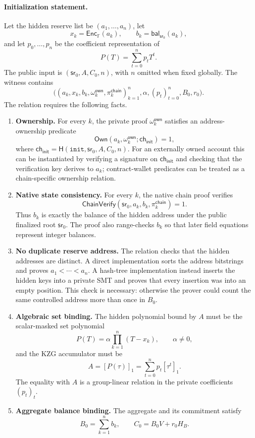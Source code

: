 \documentclass[runningheads]{llncs}
\newcommand{\F}{\mathbb{F}}
\newcommand{\Enc}{\mathsf{Enc}}
\newcommand{\bal}{\mathsf{bal}}
\newcommand{\sr}{\mathsf{sr}}
\newcommand{\Hash}{\mathsf{H}}
\begin{document}
\paragraph{Initialization statement.}
Let the hidden reserve list be \((a_1,\ldots,a_n)\), let
\[
        x_k=\Enc_{\F}(a_k),\qquad b_k=\bal_{\sr_0}(a_k),
\]
and let \(p_0,\ldots,p_n\) be the coefficient representation of
\[
        P(T)=\sum_{t=0}^n p_tT^t .
\]
The public input is \((\sr_0,A,C_0,n)\), with \(n\) omitted when fixed globally.  The witness contains
\[
 \bigl((a_k,x_k,b_k,\omega_k^{\mathsf{own}},\pi_k^{\mathsf{chain}})_{k=1}^n,
        \alpha,(p_t)_{t=0}^n,B_0,r_0\bigr).
\]
The relation requires the following facts.
\begin{enumerate}[leftmargin=1.5em]
    \item \textbf{Ownership.}  For every \(k\), the private proof \(\omega_k^{\mathsf{own}}\) satisfies an address-ownership predicate
    \[
        \mathsf{Own}(a_k,\omega_k^{\mathsf{own}};\mathsf{ch}_{\mathsf{init}})=1,
    \]
    where \(\mathsf{ch}_{\mathsf{init}}=\Hash(\mathtt{init},\sr_0,A,C_0,n)\).  For an externally owned account this can be instantiated by verifying a signature on \(\mathsf{ch}_{\mathsf{init}}\) and checking that the verification key derives to \(a_k\); contract-wallet predicates can be treated as a chain-specific ownership relation.
    \item \textbf{Native state consistency.}  For every \(k\), the native chain proof verifies
    \[
        \mathsf{ChainVerify}(\sr_0,a_k,b_k,\pi_k^{\mathsf{chain}})=1 .
    \]
    Thus \(b_k\) is exactly the balance of the hidden address under the public finalized root \(\sr_0\).  The proof also range-checks \(b_k\) so that later field equations represent integer balances.
    \item \textbf{No duplicate reserve address.}  The relation checks that the hidden addresses are distinct.  A direct implementation sorts the address bitstrings and proves \(a_1<\cdots<a_n\).  A hash-tree implementation instead inserts the hidden keys into a private SMT and proves that every insertion was into an empty position.  This check is necessary: otherwise the prover could count the same controlled address more than once in \(B_0\).
    \item \textbf{Algebraic set binding.}  The hidden polynomial bound by \(A\) must be the scalar-masked set polynomial
    \[
        P(T)=\alpha\prod_{k=1}^n(T-x_k),\qquad \alpha\ne0,
    \]
    and the KZG accumulator must be
    \[
        A=[P(\tau)]_1=\sum_{t=0}^n p_t[\tau^t]_1 .
    \]
    The equality with \(A\) is a group-linear relation in the private coefficients \((p_t)_t\).
    \item \textbf{Aggregate balance binding.}  The aggregate and its commitment satisfy
    \[
        B_0=\sum_{k=1}^n b_k,
        \qquad
        C_0=B_0V+r_0H_B .
    \]
\end{enumerate}
\end{document}
